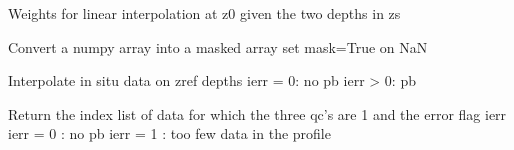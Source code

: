 \documentclass[letterpaper,10pt,english]{sphinxmanual}
\begin{document}

\begin{fulllineitems}
\label{\detokenize{pargopy:pargopy.general_tools.lincoef}}
Weights for linear interpolation at z0 given the two depths in zs

\end{fulllineitems}


\begin{fulllineitems}
\label{\detokenize{pargopy:pargopy.general_tools.npa2ma}}
Convert a numpy array into a masked array
set mask=True on NaN

\end{fulllineitems}


\begin{fulllineitems}
\label{\detokenize{pargopy:pargopy.general_tools.raw_to_interpolate}}
Interpolate in situ data on zref depths
ierr = 0: no pb
ierr \textgreater{} 0: pb

\end{fulllineitems}


\begin{fulllineitems}
\label{\detokenize{pargopy:pargopy.general_tools.remove_bad_qc}}
Return the index list of data for which the three qc’s are 1
and the error flag ierr
ierr = 0 : no pb
ierr = 1 : too few data in the profile

\end{fulllineitems}
\end{document}
